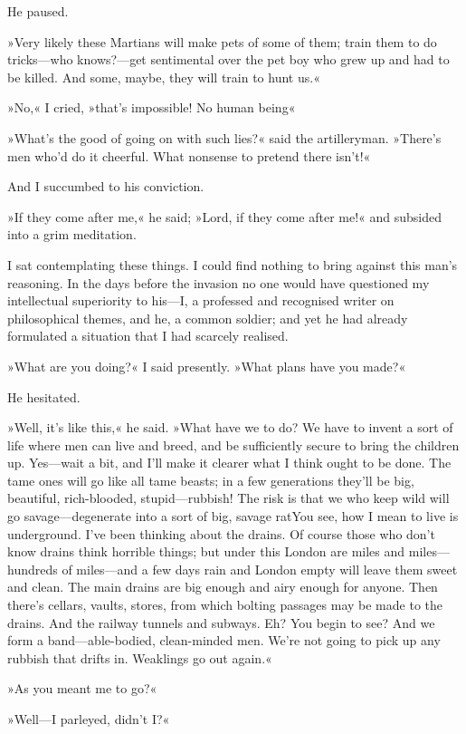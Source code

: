 He paused.

»Very likely these Martians will make pets of some of them; train them to do tricks—who knows?—get sentimental over the pet boy who grew up and had to be killed. And some, maybe, they will train to hunt us.«

»No,« I cried, »that's impossible! No human being\longdash«

»What's the good of going on with such lies?« said the artilleryman. »There's men who'd do it cheerful. What nonsense to pretend there isn't!«

And I succumbed to his conviction.

»If they come after me,« he said; »Lord, if they come after me!« and subsided into a grim meditation.

I sat contemplating these things. I could find nothing to bring against this man's reasoning. In the days before the invasion no one would have questioned my intellectual superiority to his—I, a professed and recognised writer on philosophical themes, and he, a common soldier; and yet he had already formulated a situation that I had scarcely realised.

»What are you doing?« I said presently. »What plans have you made?«

He hesitated.

»Well, it's like this,« he said. »What have we to do? We have to invent a sort of life where men can live and breed, and be sufficiently secure to bring the children up. Yes—wait a bit, and I'll make it clearer what I think ought to be done. The tame ones will go like all tame beasts; in a few generations they'll be big, beautiful, rich-blooded, stupid—rubbish! The risk is that we who keep wild will go savage—degenerate into a sort of big, savage rat\textellipsis You see, how I mean to live is underground. I've been thinking about the drains. Of course those who don't know drains think horrible things; but under this London are miles and miles—hundreds of miles—and a few days rain and London empty will leave them sweet and clean. The main drains are big enough and airy enough for anyone. Then there's cellars, vaults, stores, from which bolting passages may be made to the drains. And the railway tunnels and subways. Eh? You begin to see? And we form a band—able-bodied, clean-minded men. We're not going to pick up any rubbish that drifts in. Weaklings go out again.«

»As you meant me to go?«

»Well—I parleyed, didn't I?«

